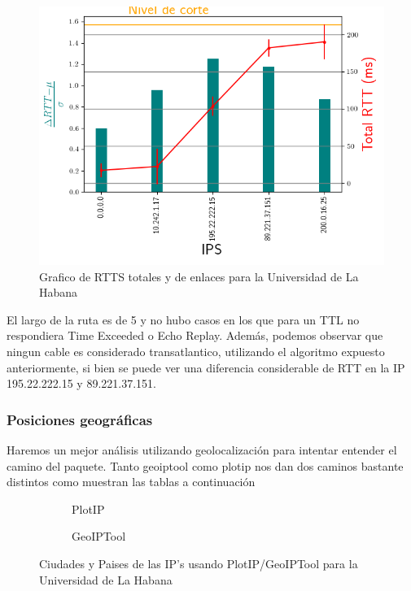 \begin{figure}[ht]
	\begin{center}
		\includegraphics[width=0.8\columnwidth]{imagenes/rtts_habana.png}
		\caption{Grafico de RTTS totales y de enlaces para la Universidad de La Habana}
	\end{center}
\end{figure}

El largo de la ruta es de 5 y no hubo casos en los que para un TTL no respondiera
Time Exceeded o Echo Replay. Adem\'as, podemos observar que ningun cable es considerado
transatlantico, utilizando el algoritmo expuesto anteriormente, si bien se
puede ver una diferencia considerable de RTT en la IP 195.22.222.15 y
89.221.37.151.  \\

\subsubsection{Posiciones geográficas}

Haremos un mejor an\'alisis utilizando geolocalizaci\'on para intentar entender
el camino del paquete. Tanto geoiptool como plotip nos dan dos caminos bastante
distintos como muestran las tablas a continuaci\'on
 
\begin{figure}[ht]
	\begin{subfigure}[b]{0.5\textwidth}
		\centering
		
		\caption{PlotIP}
	\end{subfigure}
	\begin{subfigure}[b]{0.5\textwidth}
		\centering
		
		\caption{GeoIPTool}
	\end{subfigure}
	\caption{Ciudades y Paises de las IP's usando PlotIP/GeoIPTool para la Universidad de La Habana}
\end{figure}


